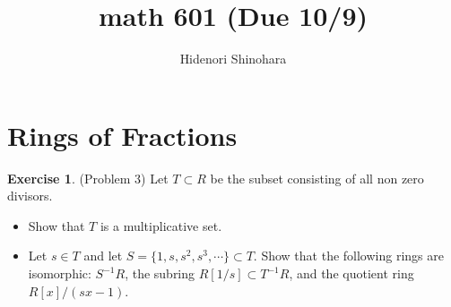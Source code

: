 \documentclass[12pt, psamsfonts]{amsart}
\theoremstyle{definition}
\newtheorem*{exer}{Exercise}
\theoremstyle{remark}
\numberwithin{equation}{section}
\begin{document}
\title{math 601 (Due 10/9)}
\author{Hidenori Shinohara}
\maketitle
\tableofcontents

\section{Rings of Fractions}

\begin{exer}{(Problem 3)}
  Let $T \subset R$ be the subset consisting of all non zero divisors.
  \begin{itemize}
    \item
      Show that $T$ is a multiplicative set.
    \item
      Let $s \in T$ and let $S = \{ 1, s, s^2, s^3, \cdots \} \subset T$.
      Show that the following rings are isomorphic: $S^{-1}R$, the subring $R[1/s] \subset T^{-1}R$, and the quotient ring $R[x]/(sx - 1)$.
  \end{itemize}
\end{exer}
\end{document}
